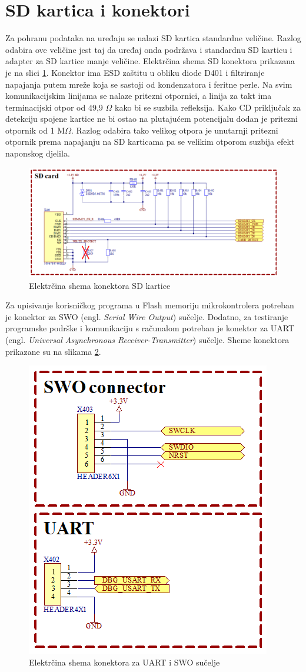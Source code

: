 \section{SD kartica i konektori}
Za pohranu podataka na uređaju se nalazi SD kartica standardne veličine. Razlog odabira ove veličine jest taj da uređaj onda podržava i standardnu SD karticu i adapter za SD kartice manje veličine. Elektrčina shema SD konektora prikazana je na slici \ref{slk:SD}. Konektor ima ESD zaštitu u obliku diode D401 i filtriranje napajanja putem mreže koja se sastoji od kondenzatora i feritne perle. Na svim komunikacijskim linijama se nalaze pritezni otpornici, a linija za takt ima terminacijski otpor od 49,9 $\Omega$ kako bi se suzbila refleksija. Kako CD priključak za detekciju spojene kartice ne bi ostao na plutajućem potencijalu dodan je pritezni otpornik od 1 M$\Omega$. Razlog odabira tako velikog otpora je unutarnji pritezni otpornik prema napajanju na SD karticama pa se velikim otporom suzbija efekt naponskog djelila.
\begin{figure}[h!bt]
    \centering
    \includegraphics[width=\textwidth]{Figures/SD.png}
    \caption{Elektrčina shema konektora SD kartice}
    \label{slk:SD}
\end{figure}

Za upisivanje korisničkog programa u Flash memoriju mikrokontrolera potreban je konektor za SWO (engl. \textit{Serial Wire Output}) sučelje. Dodatno, za testiranje programske podrške i komunikaciju s računalom potreban je konektor za UART (engl. \textit{Universal Asynchronous Receiver-Transmitter}) sučelje. Sheme konektora prikazane su na slikama \ref{slk:UART_SWO}.
\begin{figure}[!hbt]
    \centering
    \includegraphics[width=6 cm]{Figures/SWO_UART.png}
    \caption{Elektrčina shema konektora za UART i SWO sučelje}
    \label{slk:UART_SWO}
\end{figure}

